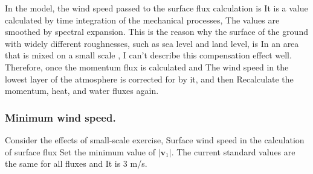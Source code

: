 In the model, the wind speed passed to the surface flux calculation is
It is a value calculated by time integration of the mechanical
processes, The values are smoothed by spectral expansion. This is the
reason why the surface of the ground with widely different roughnesses,
such as sea level and land level, is In an area that is mixed on a small
scale , I can't describe this compensation effect well. Therefore, once
the momentum flux is calculated and The wind speed in the lowest layer
of the atmosphere is corrected for by it, and then Recalculate the
momentum, heat, and water fluxes again.

\hypertarget{minimum-wind-speed.}{%
\subsubsection{Minimum wind speed.}\label{minimum-wind-speed.}}

Consider the effects of small-scale exercise, Surface wind speed in the
calculation of surface flux Set the minimum value of \(|\mathbf{v}_1|\).
The current standard values are the same for all fluxes and It is 3 m/s.
